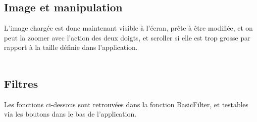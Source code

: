 \documentclass[12pt]{article}
\begin{document}
    \subsection{Image et manipulation}
    L'image chargée est donc maintenant visible à l'écran, prête à être modifiée, et on peut la zoomer avec l'action des deux doigts, 
    et scroller si elle est trop grosse par rapport à la taille définie dans l'application.\\
    \\

    \subsection{Filtres}
    Les fonctions ci-dessous sont retrouvées dans la fonction BasicFilter, et testables via les boutons dans le bas de l'application.\\
    \\
\end{document}
